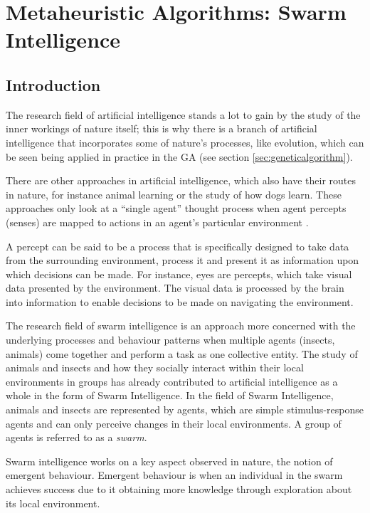 \chapter[Swarm Intelligence]{Metaheuristic Algorithms: Swarm Intelligence}
\label{chpt:swarm}
\section{Introduction}
The research field of artificial intelligence stands a lot to gain by the study of the inner workings of nature itself; this is why there is a branch of artificial intelligence that incorporates some of nature's processes, like evolution, which can be seen being applied in practice in the \gls{GA} (see section \ref{sec:geneticalgorithm}).

 There are other approaches in artificial intelligence, which also have their routes in nature, for instance animal learning or the study of how dogs learn\cite{DLearning}. These approaches only look at a “single agent” thought process when agent percepts (senses) are mapped to actions in an agent's particular environment \cite{DLearning}. 
 
 A percept can be said to be a process that is specifically designed to take data from the surrounding environment, process it and present it as information upon which decisions can be made\cite{DLearning,AIModernApproach}. For instance, eyes are percepts, which take visual data presented by the environment\cite{DLearning,AIModernApproach}. The visual data is processed by the brain into information to enable decisions to be made on navigating the environment\cite{DLearning,AIModernApproach}.

The research field of swarm intelligence is an approach more concerned with the underlying processes and behaviour patterns when multiple agents (insects, animals) come together and perform a task as one collective entity\cite{DLearning,AIModernApproach}.  The study of animals and insects and how they socially interact within their local environments in groups has already contributed to artificial intelligence as a whole in the form of Swarm Intelligence\cite{ChaoticSwarmIntel,BeeJobShop}.  In the field of Swarm Intelligence, animals and insects are represented by agents, which are simple stimulus-response agents and can only perceive changes in their local environments. A group of agents is referred to as a \emph{swarm}.

Swarm intelligence works on a key aspect observed in nature, the notion of emergent behaviour\cite{SwarmArt,FundamentalSwarm}. Emergent behaviour is when an individual in the swarm achieves success due to it obtaining more knowledge through exploration about its local environment\cite{SwarmArt,FundamentalSwarm}.

